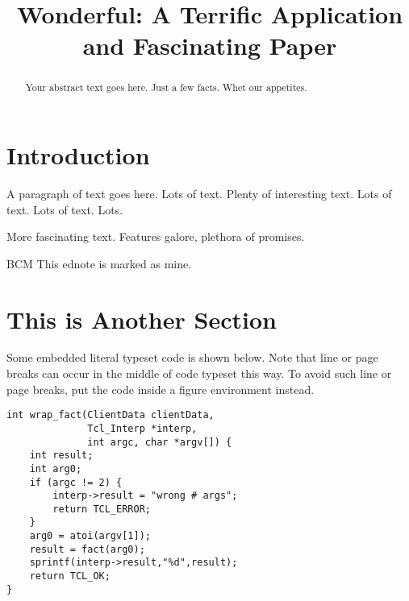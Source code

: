 \documentclass[XXX,endnotes]{usetex-v1}
\begin{document}
\title{Wonderful: A Terrific Application and Fascinating Paper}


\author{
\and
{}
%
} %

\maketitle

\begin{abstract}
  Your abstract text goes here.  Just a few facts.  Whet our
  appetites.
\end{abstract}

\section{Introduction}

A paragraph of text goes here.  Lots of text.  Plenty of interesting
text.  Lots of text.  Lots of text.  Lots.  

More fascinating text. Features galore, plethora of promises.
\begin{ednote}{BCM}
  This ednote is marked as mine.
\end{ednote}

\section{This is Another Section}

Some embedded literal typeset code is shown below.  Note that line or
page breaks can occur in the middle of code typeset this way.  To
avoid such line or page breaks, put the code inside a figure
environment instead.

\begin{small}
\begin{verbatim}
int wrap_fact(ClientData clientData,
              Tcl_Interp *interp,
              int argc, char *argv[]) {
    int result;
    int arg0;
    if (argc != 2) {
        interp->result = "wrong # args";
        return TCL_ERROR;
    }
    arg0 = atoi(argv[1]);
    result = fact(arg0);
    sprintf(interp->result,"%d",result);
    return TCL_OK;
}
\end{verbatim}
\end{small}
\end{document}
